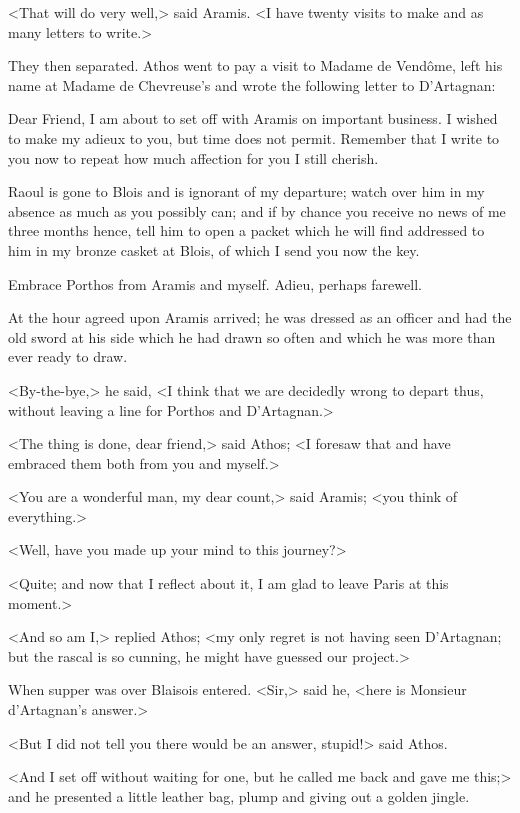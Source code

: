 <That will do very well,> said Aramis. <I have twenty visits to make and as many letters to write.>

They then separated. Athos went to pay a visit to Madame de Vendôme, left his name at Madame de Chevreuse's and wrote the following letter to D'Artagnan:  

\begin{mail}{}{Dear Friend,}
I am about to set off with Aramis on important business. I wished to make my adieux to you, but time does not permit. Remember that I write to you now to repeat how much affection for you I still cherish.

Raoul is gone to Blois and is ignorant of my departure; watch over him in my absence as much as you possibly can; and if by chance you receive no news of me three months hence, tell him to open a packet which he will find addressed to him in my bronze casket at Blois, of which I send you now the key.

Embrace Porthos from Aramis and myself. Adieu, perhaps farewell.
\end{mail}

At the hour agreed upon Aramis arrived; he was dressed as an officer and had the old sword at his side which he had drawn so often and which he was more than ever ready to draw.

<By-the-bye,> he said, <I think that we are decidedly wrong to depart thus, without leaving a line for Porthos and D'Artagnan.>

<The thing is done, dear friend,> said Athos; <I foresaw that and have embraced them both from you and myself.>

<You are a wonderful man, my dear count,> said Aramis; <you think of everything.>

<Well, have you made up your mind to this journey?>

<Quite; and now that I reflect about it, I am glad to leave Paris at this moment.>

<And so am I,> replied Athos; <my only regret is not having seen D'Artagnan; but the rascal is so cunning, he might have guessed our project.>

When supper was over Blaisois entered. <Sir,> said he, <here is Monsieur d'Artagnan's answer.>

<But I did not tell you there would be an answer, stupid!> said Athos.

<And I set off without waiting for one, but he called me back and gave me this;> and he presented a little leather bag, plump and giving out a golden jingle.

